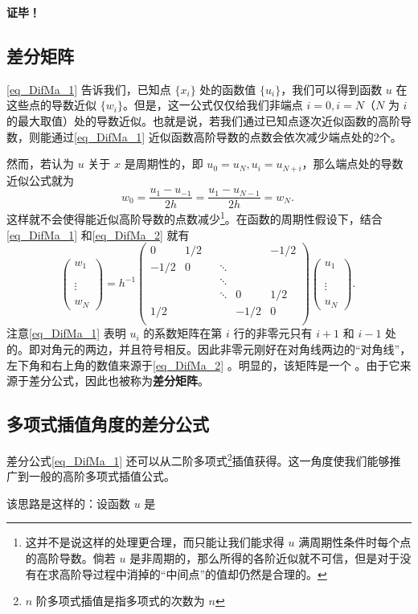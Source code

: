 \textbf{证毕！}

\subsection{差分矩阵}
\autoref{eq_DifMa_1} 告诉我们，已知点 $\{x_i\}$ 处的函数值 $\{u_i\}$，我们可以得到函数 $u$ 在这些点的导数近似 $\{w_i\}$。但是，这一公式仅仅给我们非端点 $i=0,i=N$（$N$ 为 $i$ 的最大取值）处的导数近似。也就是说，若我们通过已知点逐次近似函数的高阶导数，则能通过\autoref{eq_DifMa_1} 近似函数高阶导数的点数会依次减少端点处的2个。

然而，若认为 $u$ 关于 $x$ 是周期性的，即 $u_0=u_N,u_i=u_{N+i}$，那么端点处的导数近似公式就为
\begin{equation}\label{eq_DifMa_2}
w_0=\frac{u_{1}-u_{-1}}{2h}=\frac{u_{1}-u_{N-1}}{2h}=w_N.~
\end{equation}
这样就不会使得能近似高阶导数的点数减少\footnote{这并不是说这样的处理更合理，而只能让我们能求得 $u$ 满周期性条件时每个点的高阶导数。倘若 $u$ 是非周期的，那么所得的各阶近似就不可信，但是对于没有在求高阶导过程中消掉的“中间点”的值却仍然是合理的。}。在函数的周期性假设下，结合\autoref{eq_DifMa_1} 和\autoref{eq_DifMa_2} 就有
\begin{equation}
\begin{pmatrix}
w_1\\
\\
\\
\vdots\\
\\
w_N
\end{pmatrix}=h^{-1}\begin{pmatrix}
0&1/2&&&&-1/2\\
-1/2&0&&\ddots&&\\
&&&\ddots&&\\
&&&\ddots&0&1/2\\
1/2&&&&-1/2&0\\
\end{pmatrix}\begin{pmatrix}
u_1\\
\\
\\
\vdots\\
\\
u_N
\end{pmatrix}.~
\end{equation}
注意\autoref{eq_DifMa_1} 表明 $u_i$ 的系数矩阵在第 $i$ 行的非零元只有 $i+1$ 和 $i-1$ 处的。即对角元的两边，并且符号相反。因此非零元刚好在对角线两边的“对角线”，左下角和右上角的数值来源于\autoref{eq_DifMa_2} 。明显的，该矩阵是一个 。由于它来源于差分公式，因此也被称为\textbf{差分矩阵}。

\subsection{多项式插值角度的差分公式}
差分公式\autoref{eq_DifMa_1} 还可以从二阶多项式\footnote{$n$ 阶多项式插值是指多项式的次数为 $n$}插值获得。这一角度使我们能够推广到一般的高阶多项式插值公式。

该思路是这样的：设函数 $u$ 是 



